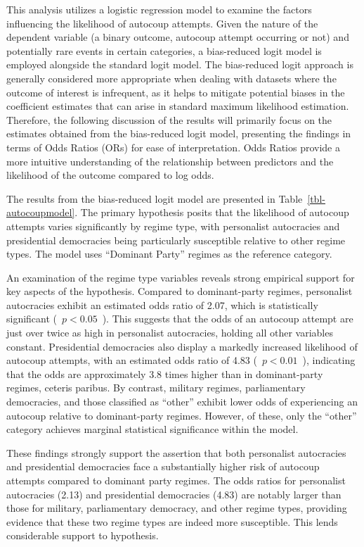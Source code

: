 \documentclass[
  12pt,
]{report}
\begin{document}
This analysis utilizes a logistic regression model to examine the
factors influencing the likelihood of autocoup attempts. Given the
nature of the dependent variable (a binary outcome, autocoup attempt
occurring or not) and potentially rare events in certain categories, a
bias-reduced logit model is employed alongside the standard logit model.
The bias-reduced logit approach is generally considered more appropriate
when dealing with datasets where the outcome of interest is infrequent,
as it helps to mitigate potential biases in the coefficient estimates
that can arise in standard maximum likelihood estimation. Therefore, the
following discussion of the results will primarily focus on the
estimates obtained from the bias-reduced logit model, presenting the
findings in terms of Odds Ratios (ORs) for ease of interpretation. Odds
Ratios provide a more intuitive understanding of the relationship
between predictors and the likelihood of the outcome compared to log
odds.

The results from the bias-reduced logit model are presented in
Table~\ref{tbl-autocoupmodel}. The primary hypothesis posits that the
likelihood of autocoup attempts varies significantly by regime type,
with personalist autocracies and presidential democracies being
particularly susceptible relative to other regime types. The model uses
``Dominant Party'' regimes as the reference category.

An examination of the regime type variables reveals strong empirical
support for key aspects of the hypothesis. Compared to dominant-party
regimes, personalist autocracies exhibit an estimated odds ratio of
2.07, which is statistically significant ( \,\(p<0.05\) \,). This
suggests that the odds of an autocoup attempt are just over twice as
high in personalist autocracies, holding all other variables constant.
Presidential democracies also display a markedly increased likelihood of
autocoup attempts, with an estimated odds ratio of 4.83 (\, \(p<0.01\)
\,), indicating that the odds are approximately 3.8 times higher than in
dominant-party regimes, ceteris paribus. By contrast, military regimes,
parliamentary democracies, and those classified as ``other'' exhibit
lower odds of experiencing an autocoup relative to dominant-party
regimes. However, of these, only the ``other'' category achieves
marginal statistical significance within the model.

These findings strongly support the assertion that both personalist
autocracies and presidential democracies face a substantially higher
risk of autocoup attempts compared to dominant party regimes. The odds
ratios for personalist autocracies (2.13) and presidential democracies
(4.83) are notably larger than those for military, parliamentary
democracy, and other regime types, providing evidence that these two
regime types are indeed more susceptible. This lends considerable
support to hypothesis.
\end{document}
